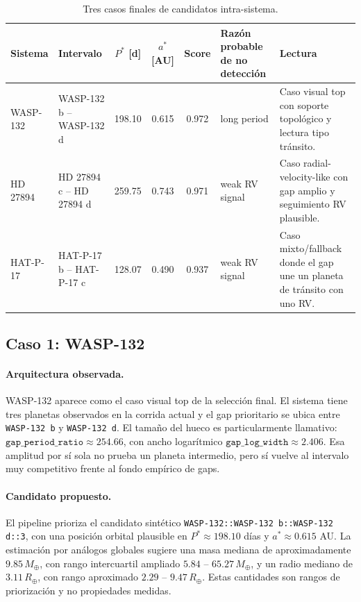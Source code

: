 \begin{table}[htbp]
\centering
\caption{Tres casos finales de candidatos intra-sistema.}
\label{tab:three-final-cases}
\begin{tabular}{>{\raggedright\arraybackslash}p{} >{\raggedright\arraybackslash}p{} c c c >{\raggedright\arraybackslash}p{} >{\raggedright\arraybackslash}p{}}
\toprule
Sistema & Intervalo & \(P^\ast\) [d] & \(a^\ast\) [AU] & Score & Raz\'on probable de no detecci\'on & Lectura \\
\midrule
WASP-132 & WASP-132 b -- WASP-132 d & 198.10 & 0.615 & 0.972 & long period & Caso visual top con soporte topol\'ogico y lectura tipo tr\'ansito. \\
HD 27894 & HD 27894 c -- HD 27894 d & 259.75 & 0.743 & 0.971 & weak RV signal & Caso radial-velocity-like con gap amplio y seguimiento RV plausible. \\
HAT-P-17 & HAT-P-17 b -- HAT-P-17 c & 128.07 & 0.490 & 0.937 & weak RV signal & Caso mixto/fallback donde el gap une un planeta de tr\'ansito con uno RV. \\
\bottomrule
\end{tabular}
\end{table}

\subsection{Caso 1: WASP-132}

\paragraph{Arquitectura observada.}
WASP-132 aparece como el caso visual top de la selecci\'on final. El sistema tiene tres planetas observados en la corrida actual y el gap prioritario se ubica entre \texttt{WASP-132 b} y \texttt{WASP-132 d}. El tama\~no del hueco es particularmente llamativo: \(\texttt{gap\_period\_ratio}\approx 254.66\), con ancho logar\'itmico \(\texttt{gap\_log\_width}\approx 2.406\). Esa amplitud por s\'i sola no prueba un planeta intermedio, pero s\'i vuelve al intervalo muy competitivo frente al fondo emp\'irico de gaps.

\paragraph{Candidato propuesto.}
El pipeline prioriza el candidato sint\'etico \texttt{WASP-132::WASP-132 b::WASP-132 d::3}, con una posici\'on orbital plausible en \(P^\ast \approx 198.10\) d\'ias y \(a^\ast \approx 0.615\) AU. La estimaci\'on por an\'alogos globales sugiere una masa mediana de aproximadamente \(9.85\,M_\oplus\), con rango intercuartil ampliado \(5.84\) -- \(65.27\,M_\oplus\), y un radio mediano de \(3.11\,R_\oplus\), con rango aproximado \(2.29\) -- \(9.47\,R_\oplus\). Estas cantidades son rangos de priorizaci\'on y no propiedades medidas.

